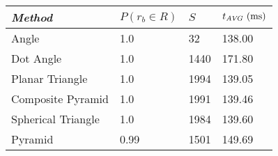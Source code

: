 
\begin{tabular}{m{}|m{}|m{}|m{}}
    \toprule
    \textit{Method} & $P(r_b \in R)$ & $S$ & $t_{\AVG} \ (\si{ms})$  \\ \hline
    Angle & \num{1.0} & \num{32} & \num{138.00} \\ \hline
    Dot Angle & \num{1.0} & \num{1440} & \num{171.80} \\ \hline
    Planar \newline Triangle & \num{1.0} & \num{1994} & \num{139.05} \\ \hline
    Composite \newline Pyramid & \num{1.0} & \num{1991} & \num{139.46} \\ \hline
    Spherical \newline Triangle & \num{1.0} & \num{1984} & \num{139.60} \\ \hline
    Pyramid & \num{0.99} & \num{1501} & \num{149.69} \\ \bottomrule
\end{tabular}